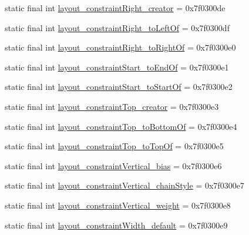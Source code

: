 \begin{DoxyCompactItemize}
\item 
static final int \mbox{\hyperlink{classandroid_1_1support_1_1constraint_1_1R_1_1attr_a329b366dcf35072950ba35c2ebaccbb3}{layout\+\_\+constraint\+Right\+\_\+creator}} = 0x7f0300de
\item 
static final int \mbox{\hyperlink{classandroid_1_1support_1_1constraint_1_1R_1_1attr_a88390997b2c64ef38008e0a1209dd2a8}{layout\+\_\+constraint\+Right\+\_\+to\+Left\+Of}} = 0x7f0300df
\item 
static final int \mbox{\hyperlink{classandroid_1_1support_1_1constraint_1_1R_1_1attr_aa7ab6f21a7788d92e694b8ea78c13292}{layout\+\_\+constraint\+Right\+\_\+to\+Right\+Of}} = 0x7f0300e0
\item 
static final int \mbox{\hyperlink{classandroid_1_1support_1_1constraint_1_1R_1_1attr_a55c621112454218578186b5e06f8d518}{layout\+\_\+constraint\+Start\+\_\+to\+End\+Of}} = 0x7f0300e1
\item 
static final int \mbox{\hyperlink{classandroid_1_1support_1_1constraint_1_1R_1_1attr_a09d13bb5f21635090c1676172c18717d}{layout\+\_\+constraint\+Start\+\_\+to\+Start\+Of}} = 0x7f0300e2
\item 
static final int \mbox{\hyperlink{classandroid_1_1support_1_1constraint_1_1R_1_1attr_a82397ac544fbbe04a557eb041e4689d8}{layout\+\_\+constraint\+Top\+\_\+creator}} = 0x7f0300e3
\item 
static final int \mbox{\hyperlink{classandroid_1_1support_1_1constraint_1_1R_1_1attr_aec047b7f863db59890548c8f06e8da6e}{layout\+\_\+constraint\+Top\+\_\+to\+Bottom\+Of}} = 0x7f0300e4
\item 
static final int \mbox{\hyperlink{classandroid_1_1support_1_1constraint_1_1R_1_1attr_a24f51dda33a94c484660e9b552114c0a}{layout\+\_\+constraint\+Top\+\_\+to\+Top\+Of}} = 0x7f0300e5
\item 
static final int \mbox{\hyperlink{classandroid_1_1support_1_1constraint_1_1R_1_1attr_ad55991d4c0c3e4144a9a164b8d7b0322}{layout\+\_\+constraint\+Vertical\+\_\+bias}} = 0x7f0300e6
\item 
static final int \mbox{\hyperlink{classandroid_1_1support_1_1constraint_1_1R_1_1attr_aa0e83db803c8fadca1a42781a35b0bcd}{layout\+\_\+constraint\+Vertical\+\_\+chain\+Style}} = 0x7f0300e7
\item 
static final int \mbox{\hyperlink{classandroid_1_1support_1_1constraint_1_1R_1_1attr_a317bc77e34fd5974e0f690a3fb83d2a6}{layout\+\_\+constraint\+Vertical\+\_\+weight}} = 0x7f0300e8
\item 
static final int \mbox{\hyperlink{classandroid_1_1support_1_1constraint_1_1R_1_1attr_a852ae278bd03fa843564100268dbb0ff}{layout\+\_\+constraint\+Width\+\_\+default}} = 0x7f0300e9

\end{DoxyCompactItemize}
